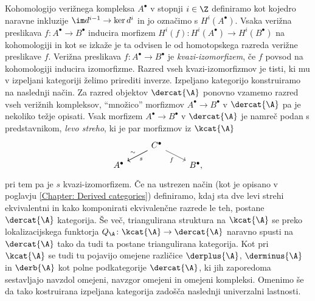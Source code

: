 Kohomologijo verižnega kompleksa $A^\bullet$ v stopnji $i \in \Z$ definiramo kot kojedro naravne inkluzije $\im d^{i-1} \to \ker d^i$ in jo označimo s $H^i(A^\bullet)$. Vsaka verižna preslikava ${f \colon A^\bullet \to B^\bullet}$ inducira morfizem $H^i(f) \colon H^i(A^\bullet) \to H^i(B^\bullet)$ na kohomologiji in kot se izkaže je ta odvisen le od homotopskega razreda verižne preslikave $f$. Verižna preslikava $f \colon A^\bullet \to B^\bullet$ je \emph{kvazi-izomorfizem}, če $f$ povsod na kohomologiji inducira izomorfizme. Razred vseh kvazi-izomorfizmov je tisti, ki mu v izpeljani kategoriji želimo prirediti inverze. Izpeljano kategorijo konstruiramo na naslednji način. Za razred objektov $\dercat{\A}$ ponovno vzamemo razred vseh verižnih kompleksov, ``množico'' morfizmov $A^\bullet \to B^\bullet$ v $\dercat{\A}$ pa je nekoliko težje opisati. Vsak morfizem $A^\bullet \to B^\bullet$ v $\dercat{\A}$ je namreč podan s predstavnikom, \ti \emph{levo streho}, ki je par morfizmov iz $\kcat{\A}$
\begin{equation*}
    \begin{tikzcd}[row sep = small, column sep = small]
	&& C^\bullet \\
	A^\bullet &&&& B^\bullet,
	\arrow["s", from=1-3, to=2-1]
	\arrow["\sim"', from=1-3, to=2-1]
	\arrow["f"', from=1-3, to=2-5]
    \end{tikzcd}
\end{equation*}
pri tem pa je $s$ kvazi-izomorfizem. Če na ustrezen način (kot je opisano v poglavju \ref{Chapter: Derived categories}) definiramo, kdaj sta dve levi strehi ekvivalentni in kako komponirati ekvivalenčne razrede le teh, postane $\dercat{\A}$ kategorija. Še več, triangulirana struktura na $\kcat{\A}$ se preko lokalizacijskega funktorja $Q_\A \colon \kcat{\A} \to \dercat{\A}$ naravno spusti na $\dercat{\A}$ tako da tudi ta postane triangulirana kategorija. Kot pri $\kcat{\A}$ se tudi tu pojavijo omejene različice $\derplus{\A}$, $\derminus{\A}$ in $\derb{\A}$ kot polne podkategorije $\dercat{\A}$, ki jih zaporedoma sestavljajo navzdol omejeni, navzgor omejeni in omejeni kompleksi. Omenimo še da tako kostruirana izpeljana kategorija zadošča naslednji univerzalni lastnosti. 

